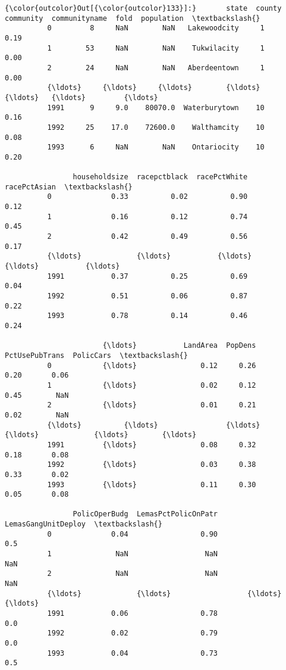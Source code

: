\documentclass[11pt]{article}
\begin{document}
\begin{Verbatim}[commandchars=\\\{\}]
{\color{outcolor}Out[{\color{outcolor}133}]:}       state  county  community  communityname  fold  population  \textbackslash{}
          0         8     NaN        NaN   Lakewoodcity     1        0.19   
          1        53     NaN        NaN    Tukwilacity     1        0.00   
          2        24     NaN        NaN   Aberdeentown     1        0.00   
          {\ldots}     {\ldots}     {\ldots}        {\ldots}            {\ldots}   {\ldots}         {\ldots}   
          1991      9     9.0    80070.0  Waterburytown    10        0.16   
          1992     25    17.0    72600.0    Walthamcity    10        0.08   
          1993      6     NaN        NaN    Ontariocity    10        0.20   
          
                householdsize  racepctblack  racePctWhite  racePctAsian  \textbackslash{}
          0              0.33          0.02          0.90          0.12   
          1              0.16          0.12          0.74          0.45   
          2              0.42          0.49          0.56          0.17   
          {\ldots}             {\ldots}           {\ldots}           {\ldots}           {\ldots}   
          1991           0.37          0.25          0.69          0.04   
          1992           0.51          0.06          0.87          0.22   
          1993           0.78          0.14          0.46          0.24   
          
                       {\ldots}           LandArea  PopDens  PctUsePubTrans  PolicCars  \textbackslash{}
          0            {\ldots}               0.12     0.26            0.20       0.06   
          1            {\ldots}               0.02     0.12            0.45        NaN   
          2            {\ldots}               0.01     0.21            0.02        NaN   
          {\ldots}          {\ldots}                {\ldots}      {\ldots}             {\ldots}        {\ldots}   
          1991         {\ldots}               0.08     0.32            0.18       0.08   
          1992         {\ldots}               0.03     0.38            0.33       0.02   
          1993         {\ldots}               0.11     0.30            0.05       0.08   
          
                PolicOperBudg  LemasPctPolicOnPatr  LemasGangUnitDeploy  \textbackslash{}
          0              0.04                 0.90                  0.5   
          1               NaN                  NaN                  NaN   
          2               NaN                  NaN                  NaN   
          {\ldots}             {\ldots}                  {\ldots}                  {\ldots}   
          1991           0.06                 0.78                  0.0   
          1992           0.02                 0.79                  0.0   
          1993           0.04                 0.73                  0.5   
          

\end{Verbatim}
\end{document}
